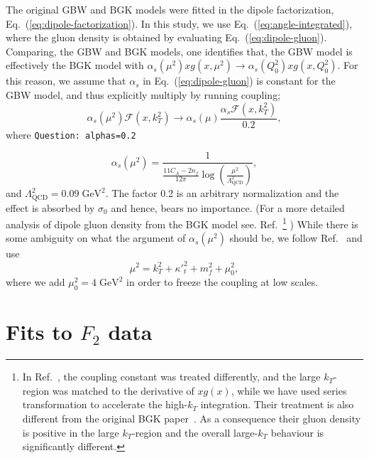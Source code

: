 \documentclass[11pt]{article}
\numberwithin{equation}{section}
\numberwithin{table}{section}
\numberwithin{figure}{section}
\newcommand{\GeV}[0]{\mathrm{GeV}}
\newcommand{\comment}[1]{\texttt{\color{red}#1}}
\begin{document}
The original GBW and BGK models were fitted in the dipole factorization, Eq.~(\ref{eq:dipole-factorization}). In this study, we use Eq.~(\ref{eq:angle-integrated}), where the gluon density is obtained by evaluating Eq.~(\ref{eq:dipole-gluon}).
Comparing, the GBW and BGK models, one identifies that, the GBW model is effectively the BGK model with $\alpha_s(\mu^2)xg(x,\mu^2)\rightarrow \alpha_s(Q_0^2)xg(x,Q_0^2)$.
For this reason, we assume that $\alpha_s$ in Eq.~(\ref{eq:dipole-gluon}) is constant for the GBW model, and thus explicitly multiply by running coupling;
%
\begin{equation}
\alpha_s(\mu^2)\mathcal{F}(x,k_T^2)\rightarrow \alpha_s(\mu)\frac{\alpha_s\mathcal{F}(x,k_T^2)}{0.2},
\end{equation}
where %
%
\comment{Question: alphas=0.2}

\begin{equation}
\alpha_s(\mu^2)=\frac{1}{\frac{11 C_A-2n_f}{12\pi}\log\left(\frac{\mu^2}{\Lambda_{\mathrm{QCD}}^2 }\right)},
\end{equation}
and  $\Lambda_{\mathrm{QCD}}^2=0.09\;\GeV^2$.
The factor 0.2 is an arbitrary normalization and the effect is absorbed by $\sigma_0$ and hence, bears no importance.
(For a more detailed analysis of dipole gluon density from the BGK model see. Ref.~\cite{Luszczak:2022fkf}\footnote{In Ref.~\cite{Luszczak:2022fkf}, the coupling constant was treated differently, and the large $k_T$-region was matched to the derivative of $xg(x)$, while we have used series transformation to accelerate the high-$k_T$ integration. Their treatment is also different from the original BGK paper~\cite{Bartels:2002cj}. As a consequence their gluon density is positive in the large $k_T$-region and the overall large-$k_T$ behaviour is significantly different.}
)
While there is some ambiguity on what the argument of $\alpha_s(\mu^2)$ should be, we follow Ref.~\cite{Kwiecinski:1997ee} and use
\begin{equation}
	\mu^2=k_T^2+{\kappa'}_t^2+m_f^2+\mu^2_0,
\end{equation}
where we add $\mu^2_0=4\;\GeV^2$ in order to freeze the coupling at low scales.

\section{Fits to $F_2$ data}
\label{Results}
\end{document}
